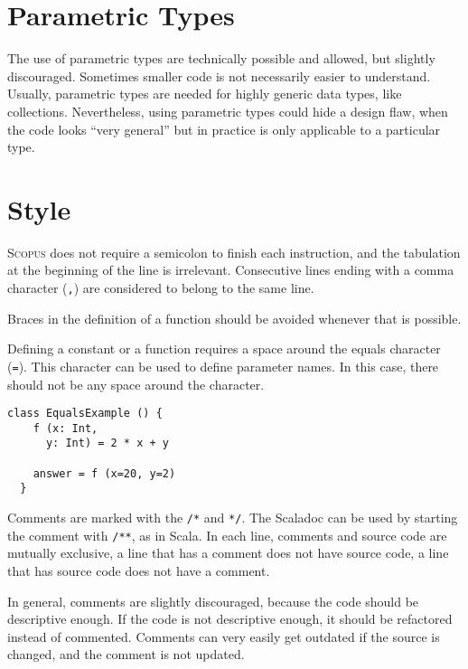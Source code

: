 \documentclass[12pt,a4paper]{book}
\newcommand{\srccode}[1]{\texttt{{#1}}}
\newcommand{\Scopus}{\textsc{Scopus}\xspace}
\begin{document}
    \section{Parametric Types}

    The use of parametric types are technically possible and allowed, but slightly discouraged.
    Sometimes smaller code is not necessarily easier to understand.
    Usually, parametric types are needed for highly generic data types, like collections.
    Nevertheless, using parametric types could hide a design flaw, when the code looks ``very general'' but in practice is only applicable to a particular type.


    \section{Style}

    \Scopus does not require a semicolon to finish each instruction, and the tabulation at the beginning of the line is irrelevant.
    Consecutive lines ending with a comma character (\srccode{,}) are considered to belong to the same line.

    Braces in the definition of a function should be avoided whenever that is possible.

    Defining a constant or a function requires a space around the equals character (\srccode{=}).
    This character can be used to define parameter names.
    In this case, there should not be any space around the character.

    \begin{lstlisting}[label={lst:exampleFunctionWithoutBraces}]
  class EqualsExample () {
    f (x: Int,
      y: Int) = 2 * x + y

    answer = f (x=20, y=2)
  }
    \end{lstlisting}

    Comments are marked with the \srccode{/*} and  \srccode{*/}.
    The Scaladoc can be used by starting the comment with \srccode{/**}, as in Scala.
    In each line, comments and source code are mutually exclusive, a line that has a comment does not have source code, a line that has source code does not have a comment.

    In general, comments are slightly discouraged, because the code should be descriptive enough.
    If the code is not descriptive enough, it should be refactored instead of commented.
    Comments can very easily get outdated if the source is changed, and the comment is not updated.
\end{document}
